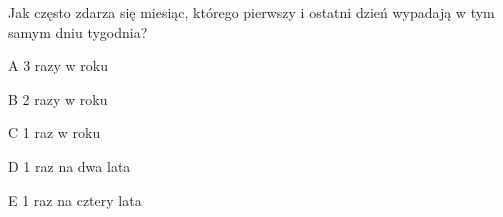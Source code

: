 \begin{tresc}
Jak często zdarza się miesiąc, którego pierwszy i ostatni dzień wypadają w tym samym dniu tygodnia?
\end{tresc}
\begin{wariant}{A} 3 razy w roku \end{wariant}
\begin{wariant}{B} 2 razy w roku \end{wariant}
\begin{wariant}{C} 1 raz w roku \end{wariant}
\begin{wariant}{D} 1 raz na dwa lata \end{wariant}
\begin{wariant}{E} 1 raz na cztery lata \end{wariant}
